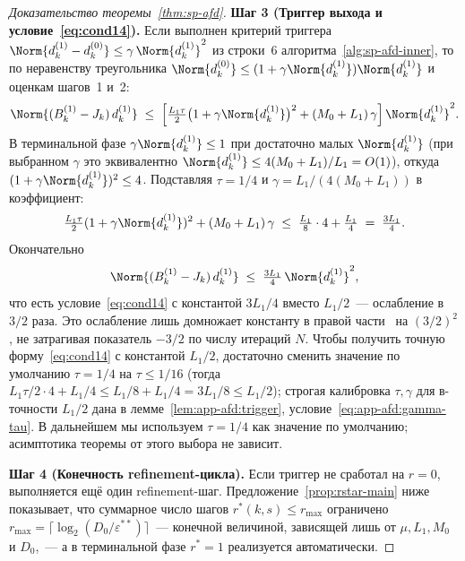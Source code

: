\begin{proof}[Доказательство теоремы~\ref{thm:sp-afd}]
\medskip\noindent\textbf{Шаг 3 (Триггер выхода и условие~\eqref{eq:cond14}).}
Если выполнен критерий триггера
$\Norm{d^{(1)}_k - d^{(0)}_k} \le \gamma\,\Norm{d^{(1)}_k}^{2}$
из строки~6 алгоритма~\ref{alg:sp-afd-inner}, то по
неравенству треугольника
$\Norm{d^{(0)}_k} \le (1 + \gamma\Norm{d^{(1)}_k})\Norm{d^{(1)}_k}$
и оценкам шагов~1 и~2:
\[
\Norm{(B_k^{(1)} - J_k)\, d^{(1)}_k}
\;\le\;
\Bigl[\tfrac{L_1\tau}{2}\bigl(1 + \gamma\Norm{d^{(1)}_k}\bigr)^{2}
       + (M_0 + L_1)\,\gamma\Bigr]\,\Norm{d^{(1)}_k}^{2}.
\]
В терминальной фазе $\gamma\Norm{d^{(1)}_k} \le 1$ при достаточно малых
$\Norm{d^{(1)}_k}$ (при выбранном $\gamma$ это эквивалентно
$\Norm{d^{(1)}_k} \le 4(M_0 + L_1)/L_1 = O(1)$), откуда
$(1 + \gamma\Norm{d^{(1)}_k})^{2} \le 4$. Подставляя $\tau = 1/4$ и
$\gamma = L_1/(4(M_0 + L_1))$ в коэффициент:
\begin{equation}
\tfrac{L_1\tau}{2}(1 + \gamma\Norm{d^{(1)}_k})^{2}
+ (M_0 + L_1)\,\gamma
\;\le\;
\tfrac{L_1}{8}\cdot 4 + \tfrac{L_1}{4}
\;=\;
\tfrac{3 L_1}{4}.
\label{eq:sp-afd-coef}
\end{equation}
Окончательно
\begin{equation}
\Norm{(B_k^{(1)} - J_k)\, d^{(1)}_k}
\;\le\; \tfrac{3 L_1}{4}\,\Norm{d^{(1)}_k}^{2},
\label{eq:sp-afd-cond14}
\end{equation}
что есть условие~\eqref{eq:cond14} с константой $3L_1/4$
вместо $L_1/2$~--- ослабление в $3/2$ раза. Это ослабление лишь
домножает константу в правой части~\cite[Theorem~3.3]{Agafonov2024VIJI}
на $(3/2)^2$, не затрагивая показатель $-3/2$ по числу итераций
$N$. Чтобы получить точную форму~\eqref{eq:cond14} с константой
$L_1/2$, достаточно сменить значение по умолчанию $\tau = 1/4$ на $\tau \le 1/16$
(тогда $L_1\tau/2 \cdot 4 + L_1/4 \le L_1/8 + L_1/4 = 3L_1/8 \le L_1/2$);
строгая калибровка $\tau, \gamma$ для в-точности $L_1/2$ дана в
лемме~\ref{lem:app-afd:trigger}, условие~\eqref{eq:app-afd:gamma-tau}.
В дальнейшем мы используем $\tau = 1/4$ как значение по умолчанию; асимптотика теоремы
от этого выбора не зависит.

\medskip\noindent\textbf{Шаг 4 (Конечность refinement-цикла).}
Если триггер не сработал на $r = 0$, выполняется ещё один refinement-шаг.
Предложение~\ref{prop:rstar-main} ниже показывает, что суммарное
число шагов $r^{*}(k, s) \le r_{\max}$ ограничено
$r_{\max} = \lceil\log_2(D_0/\varepsilon^{**})\rceil$~---
конечной величиной, зависящей лишь от $\mu, L_1, M_0$ и $D_0$,~---
а в терминальной фазе $r^{*} = 1$ реализуется автоматически.


\end{proof}
